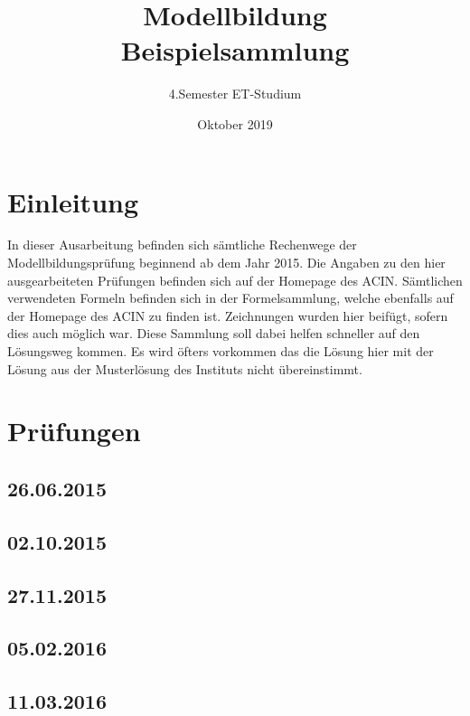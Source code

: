 \documentclass[a4paper,12p]{article}
\title{\huge Modellbildung\\\large \huge Beispielsammlung}
\author{\huge 4.Semester ET-Studium}
\date{\huge Oktober 2019}
\begin{document}
	\maketitle
	\newpage
	\tableofcontents
	\newpage
	
	\section{Einleitung}
	In dieser Ausarbeitung befinden sich sämtliche Rechenwege der Modellbildungsprüfung beginnend ab dem Jahr 2015. Die Angaben zu den hier ausgearbeiteten Prüfungen befinden sich auf der Homepage des ACIN. Sämtlichen verwendeten Formeln befinden sich in der Formelsammlung, welche ebenfalls auf der Homepage des ACIN zu finden ist. Zeichnungen wurden hier beifügt, sofern dies auch möglich war. Diese Sammlung soll dabei helfen schneller auf den Lösungsweg kommen. Es wird öfters vorkommen das die Lösung hier mit der Lösung aus der Musterlösung des Instituts nicht übereinstimmt.
	
	\section{Prüfungen}
	
	\subsection{26.06.2015}
	
	
	
	
	
	\newpage
	\subsection{02.10.2015}
	
	
	
	
	
	\newpage
	\subsection{27.11.2015}
	
	
	
	
	\newpage
	\subsection{05.02.2016}
	
	\subsection{11.03.2016}
\end{document}
